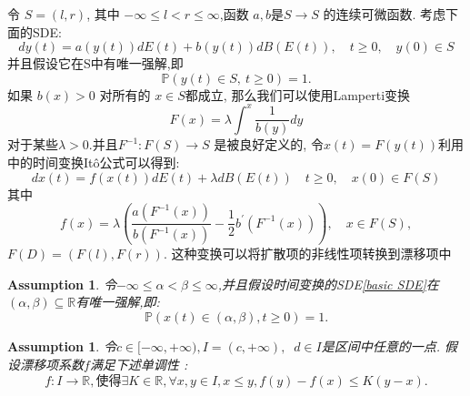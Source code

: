 \documentclass[12pt,final]{article}
\theoremstyle{plain}
\newtheorem{Assumption}[Theorem]{Assumption} %
\theoremstyle{Definition}
\theoremstyle{Remark}
\begin{document}
	令 $S=(l,r)$, 其中 $-\infty\leq l<r\leq\infty$,函数 $a,b$是$S\to S$ 的连续可微函数. 考虑下面的SDE:
	$$dy(t)=a(y(t))dE(t)+b(y(t))dB(E(t)),\quad t\geq0,\quad y(0)\in S$$
	并且假设它在S中有唯一强解,即
	$$\mathbb{P}(y(t)\in S,\:t\geq0)=1.$$
	如果 $b(x)>0$ 对所有的 $x\in S$都成立, 那么我们可以使用Lamperti变换
	\begin{equation}\label{Lamperti}
		F(x)=\lambda\int^x\frac1{b(y)}dy
	\end{equation}
	对于某些$\lambda>0.$并且$F^{-1}:F(S)\to S$ 是被良好定义的, 令$x(t)=F(y(t))$利用\cite{umarov2018beyond}中的时间变换It\^{o}公式可以得到:
	$$dx(t)=f(x(t))dE(t) + \lambda dB(E(t)) \quad t\geq0,\quad x(0)\in F(S)$$
	其中
	$$f(x)=\lambda\left(\frac{a(F^{-1}(x))}{b(F^{-1}(x))}-\frac12b^{\prime}(F^{-1}(x))\right),\quad x\in F(S),$$
	$F(D)=(F(l),F(r)).$ 这种变换可以将扩散项的非线性项转换到漂移项中
	\begin{Assumption}\label{assum1}
		令$-\infty\leq\alpha<\beta\leq\infty$,并且假设时间变换的SDE\cref{basic SDE}在$(\alpha,\beta)\subseteq\mathbb{R}$有唯一强解,即:$$\mathbb{P}(x(t)\in(\alpha,\beta), t\geq0)=1.$$
	\end{Assumption}
	\begin{Assumption}\label{assum2}
		令$c\in[-\infty,+\infty),I=(c,+\infty),\operatorname{}d\in I$是区间中任意的一点. 假设漂移项系数$f$满足下述单调性 :
		\begin{equation}
			f:I\to\mathbb{R}  , 使得 \exists K \in\mathbb{R},\forall x,y\in I,x\leq y,f(y)-f(x)\leq K(y-x).
		\end{equation}
	\end{Assumption}
\end{document}
